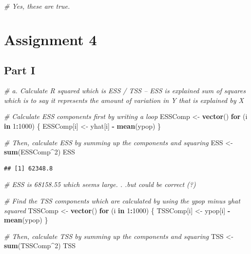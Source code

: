 \documentclass[]{article}
\newenvironment{Shaded}{\begin{snugshade}}{\end{snugshade}}
\newcommand{\KeywordTok}[1]{\textcolor[rgb]{0.13,0.29,0.53}{\textbf{#1}}}
\newcommand{\DecValTok}[1]{\textcolor[rgb]{0.00,0.00,0.81}{#1}}
\newcommand{\StringTok}[1]{\textcolor[rgb]{0.31,0.60,0.02}{#1}}
\newcommand{\CommentTok}[1]{\textcolor[rgb]{0.56,0.35,0.01}{\textit{#1}}}
\newcommand{\ControlFlowTok}[1]{\textcolor[rgb]{0.13,0.29,0.53}{\textbf{#1}}}
\newcommand{\OperatorTok}[1]{\textcolor[rgb]{0.81,0.36,0.00}{\textbf{#1}}}
\newcommand{\NormalTok}[1]{#1}
\begin{document}
\begin{Shaded}
\begin{Highlighting}[]
\CommentTok{# Yes, these are true. }
\end{Highlighting}
\end{Shaded}

\section{Assignment 4}\label{assignment-4}

\subsection{Part I}\label{part-i-3}

\begin{Shaded}
\begin{Highlighting}[]
\CommentTok{# a. Calculate R squared which is ESS / TSS -- ESS is explained sum of squares which is to say it represents the amount of variation in Y that is explained by X }

\CommentTok{# Calculate ESS components first by writing a loop}
\NormalTok{ESSComp <-}\StringTok{ }\KeywordTok{vector}\NormalTok{()}
\ControlFlowTok{for}\NormalTok{ (i }\ControlFlowTok{in} \DecValTok{1}\OperatorTok{:}\DecValTok{1000}\NormalTok{) \{}
\NormalTok{  ESSComp[i] <-}\StringTok{ }\NormalTok{yhat[i] }\OperatorTok{-}\StringTok{ }\KeywordTok{mean}\NormalTok{(ypop)}
\NormalTok{\}}

\CommentTok{# Then, calculate ESS by summing up the components and squaring}
\NormalTok{ESS <-}\StringTok{ }\KeywordTok{sum}\NormalTok{(ESSComp}\OperatorTok{^}\DecValTok{2}\NormalTok{)}
\NormalTok{ESS}
\end{Highlighting}
\end{Shaded}

\begin{verbatim}
## [1] 62348.8
\end{verbatim}

\begin{Shaded}
\begin{Highlighting}[]
\CommentTok{# ESS is 68158.55 which seems large. . .but could be correct (?)}

\CommentTok{# Find the TSS components which are calculated by using the ypop minus yhat squared}
\NormalTok{TSSComp <-}\StringTok{ }\KeywordTok{vector}\NormalTok{()}
\ControlFlowTok{for}\NormalTok{ (i }\ControlFlowTok{in} \DecValTok{1}\OperatorTok{:}\DecValTok{1000}\NormalTok{) \{}
\NormalTok{  TSSComp[i] <-}\StringTok{ }\NormalTok{ypop[i] }\OperatorTok{-}\StringTok{ }\KeywordTok{mean}\NormalTok{(ypop)}
\NormalTok{\}}

\CommentTok{# Then, calculate TSS by summing up the components and squaring }
\NormalTok{TSS <-}\StringTok{ }\KeywordTok{sum}\NormalTok{(TSSComp}\OperatorTok{^}\DecValTok{2}\NormalTok{)}
\NormalTok{TSS}
\end{Highlighting}
\end{Shaded}
\end{document}
